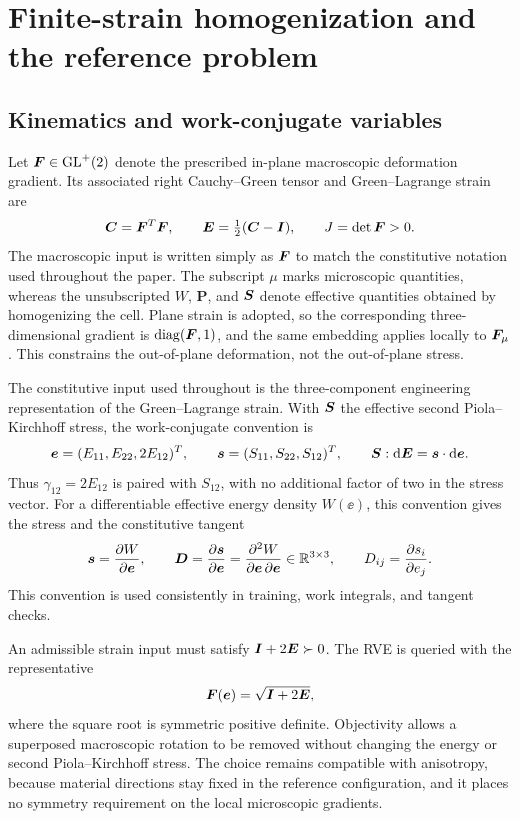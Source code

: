 \section{Finite-strain homogenization and the reference problem}
\label{sec:fom}
\subsection{Kinematics and work-conjugate variables}
Let $\bm F\in\mathrm{GL}^{+}(2)$ denote the prescribed in-plane macroscopic deformation gradient. Its associated right Cauchy--Green tensor and Green--Lagrange strain are
\begin{equation}
 \bm C=\bm F^{T}\bm F,\qquad
 \bm E=\tfrac12(\bm C-\bm I),\qquad J=\det\bm F>0.
\end{equation}
The macroscopic input is written simply as $\bm F$ to match the constitutive notation used throughout the paper. The subscript $\mu$ marks microscopic quantities, whereas the unsubscripted $W$, $\bm P$, and $\bm S$ denote effective quantities obtained by homogenizing the cell. Plane strain is adopted, so the corresponding three-dimensional gradient is $\operatorname{diag}(\bm F,1)$, and the same embedding applies locally to $\bm F_\mu$. This constrains the out-of-plane deformation, not the out-of-plane stress.

The constitutive input used throughout is the three-component engineering representation of the Green--Lagrange strain. With $\bm S$ the effective second Piola--Kirchhoff stress, the work-conjugate convention is
\begin{equation}
 \bm e=(E_{11},E_{22},2E_{12})^T,\qquad
 \bm s=(S_{11},S_{22},S_{12})^T,\qquad
 \bm S:\mathrm d\bm E=\bm s\cdot\mathrm d\bm e.
 \label{eq:voigt}
\end{equation}
Thus $\gamma_{12}=2E_{12}$ is paired with $S_{12}$, with no additional factor of two in the stress vector. For a differentiable effective energy density $W(\ee)$, this convention gives the stress and the constitutive tangent
\begin{equation}
 \bm s=\frac{\partial W}{\partial\bm e},\qquad
 \bm D=\frac{\partial\bm s}{\partial\bm e}=\frac{\partial^2 W}{\partial\bm e\,\partial\bm e}\in\mathbb R^{3\times3},\qquad
 D_{ij}=\frac{\partial s_i}{\partial e_j}.
 \label{eq:tangent}
\end{equation}
This convention is used consistently in training, work integrals, and tangent checks.

An admissible strain input must satisfy $\bm I+2\bm E\succ0$. The RVE is queried with the representative
\begin{equation}
 \bm F(\bm e)=\sqrt{\bm I+2\bm E},
 \label{eq:strain_representative}
\end{equation}
where the square root is symmetric positive definite. Objectivity allows a superposed macroscopic rotation to be removed without changing the energy or second Piola--Kirchhoff stress. The choice remains compatible with anisotropy, because material directions stay fixed in the reference configuration, and it places no symmetry requirement on the local microscopic gradients.

